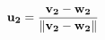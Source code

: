 \documentclass[preview]{standalone}
\begin{document}
\begin{align*}
\mathbf{u_2} = { \mathbf{v_2} - \mathbf{w_2} \over \| \mathbf{v_2} - \mathbf{w_2} \|}
\end{align*}
\end{document}
